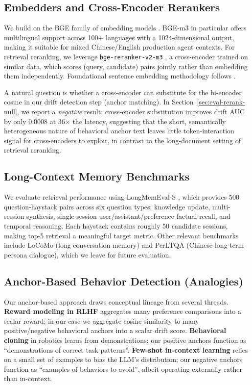 \subsection{Embedders and Cross-Encoder Rerankers}
\label{sec:related-embed}

We build on the BGE family of embedding models \citep{bgem3}.
BGE-m3 in particular offers multilingual support across 100+
languages with a 1024-dimensional output, making it suitable for
mixed Chinese/English production agent contexts. For retrieval
reranking, we leverage \texttt{bge-reranker-v2-m3}
\citep{bgereranker}, a cross-encoder trained on similar data,
which scores (query, candidate) pairs jointly rather than
embedding them independently. Foundational sentence embedding
methodology follows \citet{sbert}.

A natural question is whether a cross-encoder can substitute for
the bi-encoder cosine in our drift detection step (anchor
matching). In Section~\ref{sec:eval-rerank-null}, we report a
\emph{negative} result: cross-encoder substitution improves drift
AUC by only 0.0008 at 36$\times$ the latency, suggesting that the
short, semantically heterogeneous nature of behavioral anchor
text leaves little token-interaction signal for cross-encoders to
exploit, in contrast to the long-document setting of retrieval
reranking.

\subsection{Long-Context Memory Benchmarks}
\label{sec:related-bench}

We evaluate retrieval performance using LongMemEval-S
\citep{longmemeval2024}, which provides 500 question-haystack
pairs across six question types: knowledge update, multi-session
synthesis, single-session-user/assistant/preference factual
recall, and temporal reasoning. Each haystack contains roughly 50
candidate sessions, making top-5 retrieval a meaningful target
metric. Other relevant benchmarks include LoCoMo (long
conversation memory) and PerLTQA (Chinese long-term persona
dialogue), which we leave for future evaluation.

\subsection{Anchor-Based Behavior Detection (Analogies)}
\label{sec:related-anchors}

Our anchor-based approach draws conceptual lineage from several
threads. \textbf{Reward modeling in RLHF} aggregates many
preference comparisons into a scalar reward; in our case we
aggregate cosine similarity to many positive/negative behavioral
anchors into a scalar drift score. \textbf{Behavioral cloning}
in robotics learns from demonstrations; our positive anchors
function as ``demonstrations of correct task patterns''.
\textbf{Few-shot in-context learning} relies on a small set of
examples to bias the LLM's distribution; our negative anchors
function as ``examples of behaviors to avoid'', albeit operating
externally rather than in-context.

